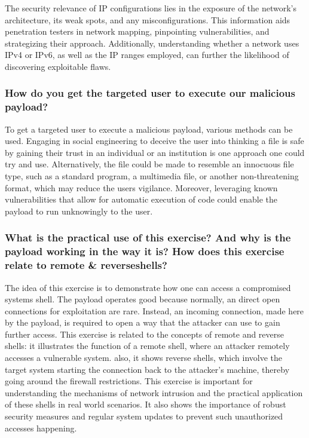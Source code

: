 The security relevance of IP configurations lies in the exposure of the network's architecture, its weak spots, and any misconfigurations.
This information aids penetration testers in network mapping, pinpointing vulnerabilities, and strategizing their approach.
Additionally, understanding whether a network uses IPv4 or IPv6, as well as the IP ranges employed, can further the likelihood of discovering exploitable flaws.



\subsubsection{How do you get the targeted user to execute our malicious payload?}
To get a targeted user to execute a malicious payload, various methods can be used.
Engaging in social engineering to deceive the user into thinking a file is safe by gaining their trust in an individual or an institution is one approach one could try and use.
Alternatively, the file could be made to resemble an innocuous file type, such as a standard program, a multimedia file, or another non-threatening format,
which may reduce the users vigilance. Moreover, leveraging known vulnerabilities that allow for automatic execution of code could enable the payload to run unknowingly to the user.





\subsubsection{What is the practical use of this exercise? And why is the payload working in the way it is? How does this exercise relate to remote \& reverseshells?}
The idea of this exercise is to demonstrate how one can access a compromised systems shell.
The payload operates good because normally, an direct open connections for exploitation are rare.
Instead, an incoming connection, made here by the payload, is required to open a way that the attacker can use to gain further access.
This exercise is related to the concepts of remote and reverse shells: it illustrates the function of a remote shell, where an attacker remotely accesses a vulnerable system.
also, it shows reverse shells, which involve the target system starting the connection back to the attacker's machine,
thereby going around the firewall restrictions. This exercise is important for understanding the mechanisms of network intrusion and the practical application of these
shells in real world scenarios. It also shows the importance of robust security measures and regular system updates to prevent such unauthorized accesses happening.



